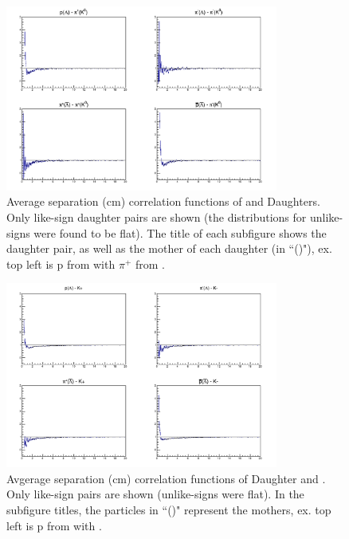 \documentclass[../AnalysisNoteJBuxton.tex]{subfiles}
\begin{document}
\begin{figure}[h]
  \centering
  \includegraphics[width=0.8\textwidth]{3_DataSelection/Figures/AvgSepCFs_LamK0.pdf}
  \caption[Avgerage Separation of \LamALam and \Ks Daughters]{Average separation (cm) correlation functions of \LamALam and \Ks Daughters.  Only like-sign daughter pairs are shown (the distributions for unlike-signs were found to be flat).  The title of each subfigure shows the daughter pair, as well as the mother of each daughter (in ``()"),  ex. top left is p from \Lam with $\pi^{+}$ from \Ks.}
  \label{fig:AvgSepLamK0}
\end{figure}

\begin{figure}[h]
  \centering
  \includegraphics[width=0.8\textwidth]{3_DataSelection/Figures/AvgSepCFs_LamKch.pdf}
  \caption[Avgerage Separation of \LamALam Daughter and \Kpm]{Avgerage separation (cm) correlation functions of \LamALam Daughter and \Kpm.  Only like-sign pairs are shown (unlike-signs were flat).  In the subfigure titles, the particles in ``()" represent the mothers, ex. top left is p from \Lam with \KchP.}
  \label{fig:AvgSepLamKch}
\end{figure}
\end{document}
